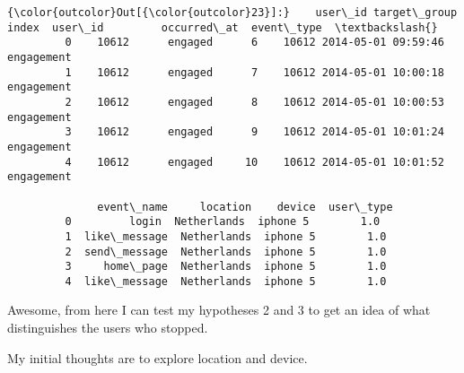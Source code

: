 \documentclass{report}
\begin{document}
\begin{Verbatim}[commandchars=\\\{\}]
{\color{outcolor}Out[{\color{outcolor}23}]:}    user\_id target\_group  index  user\_id         occurred\_at  event\_type  \textbackslash{}
         0    10612      engaged      6    10612 2014-05-01 09:59:46  engagement   
         1    10612      engaged      7    10612 2014-05-01 10:00:18  engagement   
         2    10612      engaged      8    10612 2014-05-01 10:00:53  engagement   
         3    10612      engaged      9    10612 2014-05-01 10:01:24  engagement   
         4    10612      engaged     10    10612 2014-05-01 10:01:52  engagement   
         
              event\_name     location    device  user\_type  
         0         login  Netherlands  iphone 5        1.0  
         1  like\_message  Netherlands  iphone 5        1.0  
         2  send\_message  Netherlands  iphone 5        1.0  
         3     home\_page  Netherlands  iphone 5        1.0  
         4  like\_message  Netherlands  iphone 5        1.0  
\end{Verbatim}
            
Awesome, from here I can test my hypotheses 2 and 3 to get an idea of
what distinguishes the users who stopped.

My initial thoughts are to explore location and device.
\end{document}
